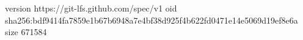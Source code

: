 version https://git-lfs.github.com/spec/v1
oid sha256:bdf9414fa7859e1b67b6948a7e4bf38d925f4b622fd0471e14e5069d19ef8e6a
size 671584
